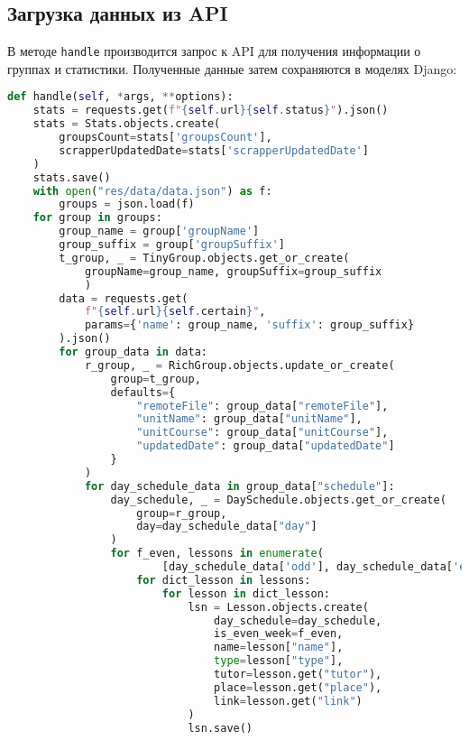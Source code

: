 \subsection{Загрузка данных из API}

В методе \texttt{handle} производится запрос к API
для получения информации о группах и статистики.
Полученные данные затем сохраняются в моделях Django:

\begin{lstlisting}[language=Python, caption={Загрузка данных из API}]
def handle(self, *args, **options):
    stats = requests.get(f"{self.url}{self.status}").json()
    stats = Stats.objects.create(
        groupsCount=stats['groupsCount'],
        scrapperUpdatedDate=stats['scrapperUpdatedDate']
    )
    stats.save()
    with open("res/data/data.json") as f:
        groups = json.load(f)
    for group in groups:
        group_name = group['groupName']
        group_suffix = group['groupSuffix']
        t_group, _ = TinyGroup.objects.get_or_create(
			groupName=group_name, groupSuffix=group_suffix
			)
        data = requests.get(
            f"{self.url}{self.certain}",
            params={'name': group_name, 'suffix': group_suffix}
        ).json()
        for group_data in data:
            r_group, _ = RichGroup.objects.update_or_create(
                group=t_group,
                defaults={
                    "remoteFile": group_data["remoteFile"],
                    "unitName": group_data["unitName"],
                    "unitCourse": group_data["unitCourse"],
                    "updatedDate": group_data["updatedDate"]
                }
            )
            for day_schedule_data in group_data["schedule"]:
                day_schedule, _ = DaySchedule.objects.get_or_create(
                    group=r_group,
                    day=day_schedule_data["day"]
                )
                for f_even, lessons in enumerate(
						[day_schedule_data['odd'], day_schedule_data['even']]):
                    for dict_lesson in lessons:
                        for lesson in dict_lesson:
                            lsn = Lesson.objects.create(
                                day_schedule=day_schedule,
                                is_even_week=f_even,
                                name=lesson["name"],
                                type=lesson["type"],
                                tutor=lesson.get("tutor"),
                                place=lesson.get("place"),
                                link=lesson.get("link")
                            )
                            lsn.save()
\end{lstlisting}

